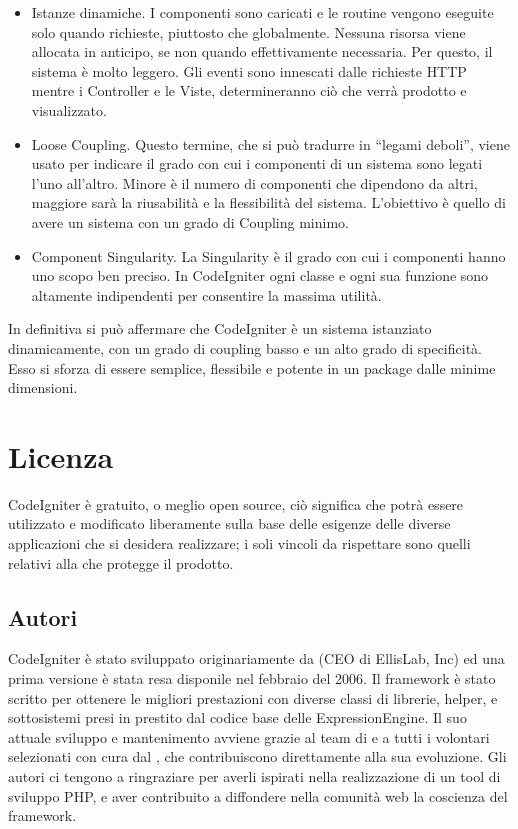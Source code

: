 \begin{itemize}
\item Istanze dinamiche. I componenti sono caricati e le routine vengono eseguite solo quando richieste, piuttosto che globalmente. Nessuna risorsa viene allocata in anticipo, se non quando effettivamente necessaria. Per questo, il sistema è molto leggero. Gli eventi sono innescati dalle richieste \ac{HTTP} mentre i Controller e le Viste, determineranno ciò che verrà prodotto e visualizzato.
\item Loose Coupling. Questo termine, che si può tradurre in ``legami deboli'', viene usato per indicare il grado con cui i componenti di un sistema sono legati l'uno all'altro. Minore è il numero di componenti che dipendono da altri, maggiore sarà la riusabilità e la flessibilità del sistema. L'obiettivo è quello di avere un sistema con un grado di Coupling minimo.
\item Component Singularity. La Singularity è il grado con cui i componenti hanno uno scopo ben preciso. In CodeIgniter ogni classe e ogni sua funzione sono altamente indipendenti per consentire la massima utilità.
\end{itemize}

In definitiva si può affermare che CodeIgniter è un sistema istanziato dinamicamente, con un grado di coupling basso e un alto grado di specificità. Esso si sforza di essere semplice, flessibile e potente in un package dalle minime dimensioni.

\section*{Licenza}
CodeIgniter è gratuito, o meglio open source, ciò significa che potrà essere utilizzato e modificato liberamente sulla base delle esigenze delle diverse applicazioni che si desidera realizzare; i soli vincoli da rispettare sono quelli relativi alla  che protegge il prodotto.

\subsection*{Autori}
CodeIgniter è stato sviluppato originariamente da  (CEO di EllisLab, Inc) ed una prima versione è stata resa disponile nel febbraio del 2006. Il framework è stato scritto per ottenere le migliori prestazioni con diverse classi di librerie, helper, e sottosistemi presi in prestito dal codice base delle ExpressionEngine. Il suo attuale sviluppo e mantenimento avviene grazie al team di  e a tutti i volontari selezionati con cura dal , che contribuiscono direttamente alla sua evoluzione. Gli autori ci tengono a ringraziare  per averli ispirati nella realizzazione di un tool di sviluppo \ac{PHP}, e aver contribuito a diffondere nella comunità web la coscienza del framework.

